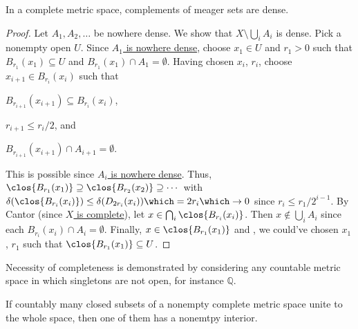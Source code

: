	\begin{thm}\label{THM: BCT}
		In a complete metric space, complements of meager sets are dense.
	\end{thm}
	
	\begin{proof}
		Let $A_1, A_2, \ldots$ be nowhere dense. We show that $X\setminus \bigcup_i A_i$ is dense. Pick a nonempty open $U$. Since \uline{$A_1$ is nowhere dense}, choose $x_1\in U$ and $r_1 > 0$ such that $B_{r_1}(x_1)\subseteq U$ and $B_{r_1}(x_1)\cap A_1 = \emptyset$. Having chosen
		$x_i$, $r_i$, choose $x_{i + 1}\in B_{r_i}(x_i)$ such that
		\begin{assmplist}
			\item $B_{r_{i + 1}}(x_{i + 1})\subseteq B_{r_i}(x_i)$,
			\item $r_{i + 1}\le r_i/2$, and
			\item $B_{r_{i + 1}}(x_{i + 1})\cap A_{i + 1} = \emptyset$.
		\end{assmplist}
		This is possible since \uline{$A_i$ is nowhere dense}.
		Thus, $\clos{B_{r_1}(x_1)}\supseteq\clos{B_{r_2}(x_2)}\supseteq\cdots$ with $\delta(\clos{B_{r_i}(x_i)})\le\delta(D_{2r_i}(x_i)) \which = 2r_i\which\to 0$ since $r_i\le r_1/2^{i - 1}$. By Cantor (since \uline{$X$ is complete}), let $x\in\bigcap_i\clos{B_{r_i}(x_i)}$. Then $x\notin \bigcup_i A_i$ since each $B_{r_i}(x_i)\cap A_i = \emptyset$. Finally, $x\in \clos{B_{r_1}(x_1)}$ and \wlogg, we could've chosen $x_1$, $r_1$ such that $\clos{B_{r_1}(x_1)}\subseteq U$.
	\end{proof}
	
	\begin{rmk}
		Necessity of completeness is demonstrated by considering any countable metric space in which singletons are not open, for instance $\mathbb Q$.
	\end{rmk}
	
	\begin{cor}
		If countably many closed subsets of a nonempty complete metric space unite to the whole space, then one of them has a nonemtpy interior.
	\end{cor}